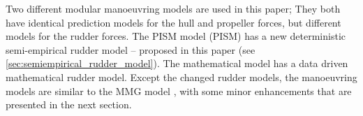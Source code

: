 Two different modular manoeuvring models are used in this paper; They both have identical prediction models for the hull and propeller forces, but different models for the rudder forces. The PISM model (PISM) has a new deterministic semi-empirical rudder model -- proposed in this paper (see \autoref{sec:semiempirical_rudder_model}). The mathematical model has a data driven mathematical rudder model. 
Except the changed rudder models, the manoeuvring models are similar to the MMG model \citep{yasukawa_introduction_2015}, with some minor enhancements that are presented in the next section.